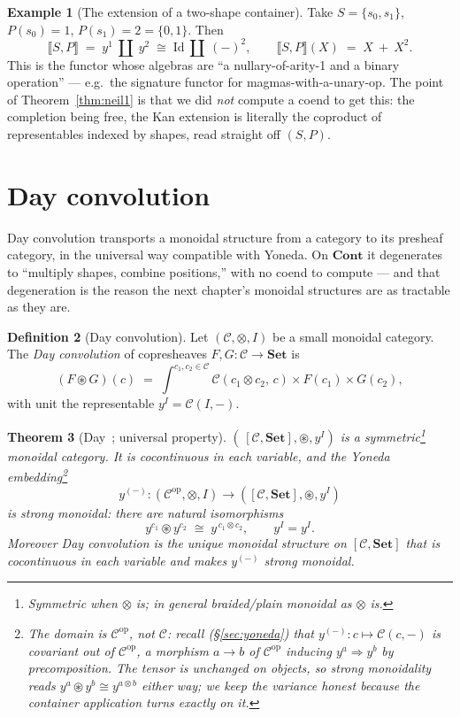 \documentclass[11pt]{article}
\theoremstyle{plain}
\newtheorem{theorem}{Theorem}[section]
\theoremstyle{definition}
\newtheorem{definition}[theorem]{Definition}
\newtheorem{example}[theorem]{Example}
\newcommand{\Set}{\mathbf{Set}}
\newcommand{\Cont}{\mathbf{Cont}}
\newcommand{\op}{^{\mathrm{op}}}
\newcommand{\Day}{\circledast}
\newcommand{\iso}{\cong}
\newcommand{\ext}[1]{\llbracket #1 \rrbracket}
\begin{document}
\begin{example}[The extension of a two-shape container]
\label{ex:lan}
Take $S=\{s_{0},s_{1}\}$, $P(s_{0})=1$, $P(s_{1})=2=\{0,1\}$. Then
\[
  \ext{S,P}\;=\;y^{1}\ \amalg\ y^{2}\;\iso\;\mathrm{Id}\ \amalg\ (-)^{2},
  \qquad
  \ext{S,P}(X)\;=\;X\ +\ X^{2}.
\]
This is the functor whose algebras are ``a nullary-of-arity-1 and a binary
operation'' --- e.g.\ the signature functor for magmas-with-a-unary-op. The
point of Theorem~\ref{thm:neil1} is that we did \emph{not} compute a coend to get
this: the completion being free, the Kan extension is literally the coproduct of
representables indexed by shapes, read straight off $(S,P)$.
\end{example}

\section{Day convolution}
\label{sec:day}

Day convolution transports a monoidal structure from a category to its presheaf
category, in the universal way compatible with Yoneda. On $\Cont$ it degenerates
to ``multiply shapes, combine positions,'' with no coend to compute --- and that
degeneration is the reason the next chapter's monoidal structures are as
tractable as they are.

\begin{definition}[Day convolution]
\label{def:day}
Let $(\mathcal{C},\otimes,I)$ be a small monoidal category. The \emph{Day
convolution} of copresheaves $F,G\colon\mathcal{C}\to\Set$ is
\[
  (F\Day G)(c) \;=\; \int^{c_{1},c_{2}\in\mathcal{C}}
     \mathcal{C}(c_{1}\otimes c_{2},\,c)\times F(c_{1})\times G(c_{2}),
\]
with unit the representable $y^{I}=\mathcal{C}(I,-)$.
\end{definition}

\begin{theorem}[Day~\cite{Day1970}; universal property]
\label{thm:dayuniv}
$(\,[\mathcal{C},\Set],\Day,y^{I})$ is a symmetric\footnote{Symmetric when
$\otimes$ is; in general braided/plain monoidal as $\otimes$ is.} monoidal
category. It is cocontinuous in each variable, and the Yoneda
embedding\footnote{The domain is $\mathcal C\op$, not $\mathcal C$: recall
(\S\ref{sec:yoneda}) that $y^{(-)}\colon c\mapsto\mathcal C(c,-)$ is
\emph{covariant out of $\mathcal C\op$}, a morphism $a\to b$ of $\mathcal C\op$
inducing $y^{a}\Rightarrow y^{b}$ by precomposition. The tensor is unchanged on
objects, so strong monoidality reads $y^{a}\Day y^{b}\iso y^{a\otimes b}$ either
way; we keep the variance honest because the container application turns exactly
on it.}
\[
  y^{(-)}\colon(\mathcal{C}\op,\otimes,I)\longrightarrow([\mathcal{C},\Set],\Day,y^{I})
\]
is \emph{strong monoidal}: there are natural isomorphisms
\[
  y^{c_{1}}\Day y^{c_{2}} \;\iso\; y^{\,c_{1}\otimes c_{2}},
  \qquad y^{I}=y^{I}.
\]
Moreover Day convolution is the \emph{unique} monoidal structure on
$[\mathcal{C},\Set]$ that is cocontinuous in each variable and makes $y^{(-)}$
strong monoidal.
\end{theorem}
\end{document}
